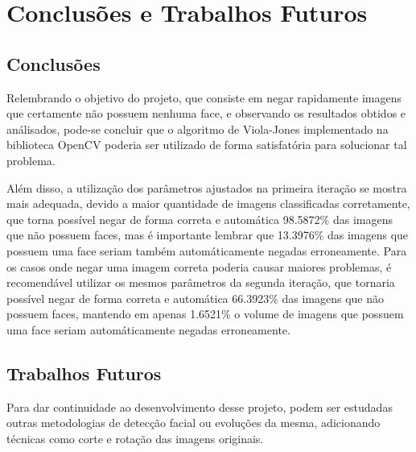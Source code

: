 \chapter{Conclusões e Trabalhos Futuros}\label{cap:conclusao}

\section{Conclusões}

Relembrando o objetivo do projeto, que consiste em negar rapidamente imagens que certamente não possuem nenhuma face, e observando os resultados obtidos e análisados, pode-se concluir que o algoritmo de Viola-Jones implementado na biblioteca OpenCV poderia ser utilizado de forma satisfatória para solucionar tal problema. 

Além disso, a utilização dos parâmetros ajustados na primeira iteração se mostra mais adequada, devido a maior quantidade de imagens classificadas corretamente, que torna possível negar de forma correta e automática 98.5872\% das imagens que não possuem faces, mas é importante lembrar que 13.3976\% das imagens que possuem uma face seriam também automáticamente negadas erroneamente. Para os casos onde negar uma imagem correta poderia causar maiores problemas, é recomendável utilizar os mesmos parâmetros da segunda iteração, que tornaria possível negar de forma correta e automática 66.3923\% das imagens que não possuem faces, mantendo em apenas 1.6521\% o volume de imagens que possuem uma face seriam  automáticamente negadas erroneamente.

\section{Trabalhos Futuros}

Para dar continuidade ao desenvolvimento desse projeto, podem ser estudadas outras metodologias de detecção facial ou evoluções da mesma, adicionando técnicas como corte e rotação das imagens originais.
